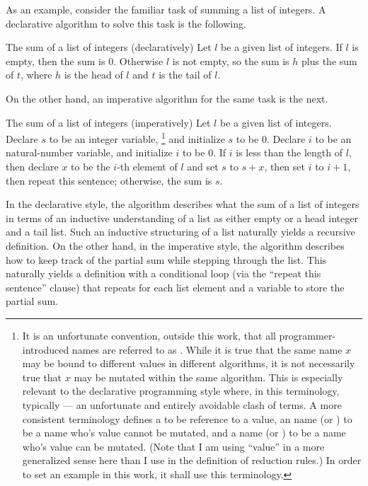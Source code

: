 As an example, consider the familiar task of summing a list of integers.
A declarative algorithm to solve this task is the following.
\begin{descgram}{The sum of a list of integers (declaratively)}
Let $l$ be a given list of integers.
If $l$ is empty, then the sum is $0$.
Otherwise $l$ is not empty, so the sum is $h$ plus the sum of $t$,
where $h$ is the head of $l$ and $t$ is the tail of $l$.
\end{descgram}
%
On the other hand, an imperative algorithm for the same task is the next.
\begin{descgram}{The sum of a list of integers (imperatively)}
Let $l$ be a given list of integers.
Declare $s$ to be an integer variable,%
\footnote{
  It is an unfortunate convention, outside this work, that all programmer-introduced names are referred to as .
  While it is true that the same name $x$ may be bound to different values in different algorithms, it is not necessarily true that $x$ may be mutated within the same algorithm.
  This is especially relevant to the declarative programming style where, in this terminology, typically  --- an unfortunate and entirely avoidable clash of terms.
  A more consistent terminology defines
  a  to be reference to a value,
  an  name (or ) to be a name who's value cannot be mutated, and
  a  name (or ) to be a name who's value can be mutated.
  (Note that I am using ``value'' in a more generalized sense here than I use in the definition of reduction rules.)
  In order to set an example in this work, it shall use this terminology.
}
and initialize $s$ to be $0$.
Declare $i$ to be an natural-number variable, and initialize $i$ to be $0$.
If $i$ is less than the length of $l$, then declare $x$ to be the $i$-th element of $l$ and set $s$ to $s + x$, then set $i$ to $i + 1$, then repeat this sentence;
  otherwise, the sum is $s$.
\end{descgram}
%

In the declarative style, the algorithm describes what the sum of a list of integers in terms of an inductive understanding of a list as either empty or a head integer and a tail list.
Such an inductive structuring of a list naturally yields a recursive definition.
On the other hand, in the imperative style, the algorithm describes how to keep track of the partial sum while stepping through the list.
This naturally yields a definition with a conditional loop (via the ``repeat this sentence'' clause) that repeats for each list element and a variable to store the partial sum.



